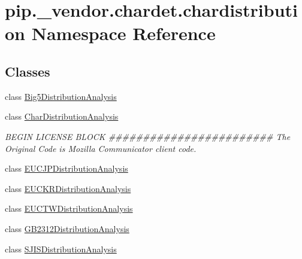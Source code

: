 \hypertarget{namespacepip_1_1__vendor_1_1chardet_1_1chardistribution}{}\section{pip.\+\_\+vendor.\+chardet.\+chardistribution Namespace Reference}
\label{namespacepip_1_1__vendor_1_1chardet_1_1chardistribution}
\subsection*{Classes}
\begin{DoxyCompactItemize}
\item 
class \hyperlink{classpip_1_1__vendor_1_1chardet_1_1chardistribution_1_1Big5DistributionAnalysis}{Big5\+Distribution\+Analysis}
\item 
class \hyperlink{classpip_1_1__vendor_1_1chardet_1_1chardistribution_1_1CharDistributionAnalysis}{Char\+Distribution\+Analysis}
\begin{DoxyCompactList}\small\item\em B\+E\+G\+IN L\+I\+C\+E\+N\+SE B\+L\+O\+CK \#\#\#\#\#\#\#\#\#\#\#\#\#\#\#\#\#\#\#\#\#\#\#\# The Original Code is Mozilla Communicator client code. \end{DoxyCompactList}\item 
class \hyperlink{classpip_1_1__vendor_1_1chardet_1_1chardistribution_1_1EUCJPDistributionAnalysis}{E\+U\+C\+J\+P\+Distribution\+Analysis}
\item 
class \hyperlink{classpip_1_1__vendor_1_1chardet_1_1chardistribution_1_1EUCKRDistributionAnalysis}{E\+U\+C\+K\+R\+Distribution\+Analysis}
\item 
class \hyperlink{classpip_1_1__vendor_1_1chardet_1_1chardistribution_1_1EUCTWDistributionAnalysis}{E\+U\+C\+T\+W\+Distribution\+Analysis}
\item 
class \hyperlink{classpip_1_1__vendor_1_1chardet_1_1chardistribution_1_1GB2312DistributionAnalysis}{G\+B2312\+Distribution\+Analysis}
\item 
class \hyperlink{classpip_1_1__vendor_1_1chardet_1_1chardistribution_1_1SJISDistributionAnalysis}{S\+J\+I\+S\+Distribution\+Analysis}
\end{DoxyCompactItemize}
